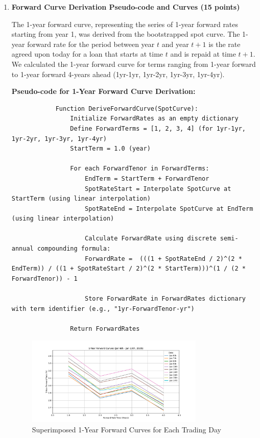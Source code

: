 \documentclass{article}
\begin{document}
\begin{enumerate}
\begin{enumerate}
        \item \textbf{Forward Curve Derivation Pseudo-code and Curves (15 points)}

            The 1-year forward curve, representing the series of 1-year forward rates starting from year 1, was derived from the bootstrapped spot curve. The 1-year forward rate for the period between year $t$ and year $t+1$ is the rate agreed upon today for a loan that starts at time $t$ and is repaid at time $t+1$. We calculated the 1-year forward curve for terms ranging from 1-year forward to 1-year forward 4-years ahead (1yr-1yr, 1yr-2yr, 1yr-3yr, 1yr-4yr).

           \textbf{Pseudo-code for 1-Year Forward Curve Derivation:}

            \begin{verbatim}
            Function DeriveForwardCurve(SpotCurve):
                Initialize ForwardRates as an empty dictionary
                Define ForwardTerms = [1, 2, 3, 4] (for 1yr-1yr, 1yr-2yr, 1yr-3yr, 1yr-4yr)
                StartTerm = 1.0 (year)

                For each ForwardTenor in ForwardTerms:
                    EndTerm = StartTerm + ForwardTenor
                    SpotRateStart = Interpolate SpotCurve at StartTerm (using linear interpolation)
                    SpotRateEnd = Interpolate SpotCurve at EndTerm (using linear interpolation)

                    Calculate ForwardRate using discrete semi-annual compounding formula:
                    ForwardRate =  (((1 + SpotRateEnd / 2)^(2 * EndTerm)) / ((1 + SpotRateStart / 2)^(2 * StartTerm)))^(1 / (2 * ForwardTenor)) - 1

                    Store ForwardRate in ForwardRates dictionary with term identifier (e.g., "1yr-ForwardTenor-yr")

                Return ForwardRates
            \end{verbatim}


            \begin{figure}[h!]
                \centering
                \includegraphics[width=0.8\textwidth]{forward_curves.pdf} %
                \caption{Superimposed 1-Year Forward Curves for Each Trading Day}
                \label{fig:forward_curves}
            \end{figure}


\end{enumerate}
\end{enumerate}
\end{document}
